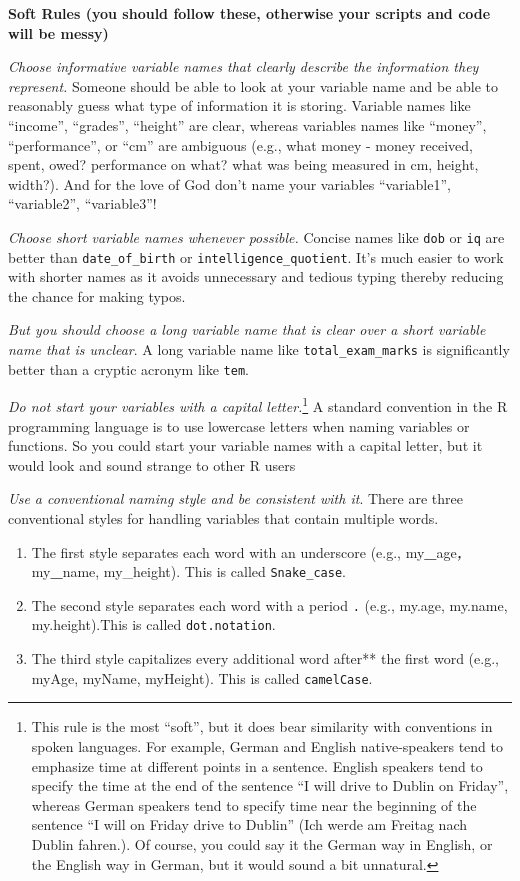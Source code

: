 \documentclass[
]{book}
\begin{document}
\textbf{Soft Rules (you should follow these, otherwise your scripts and code will be messy)}

\emph{Choose informative variable names that clearly describe the information they represent.} Someone should be able to look at your variable name and be able to reasonably guess what type of information it is storing. Variable names like ``income'', ``grades'', ``height'' are clear, whereas variables names like ``money'', ``performance'', or ``cm'' are ambiguous (e.g., what money - money received, spent, owed? performance on what? what was being measured in cm, height, width?). And for the love of God don't name your variables ``variable1'', ``variable2'', ``variable3''!

\emph{Choose short variable names whenever possible.} Concise names like \texttt{dob} or \texttt{iq} are better than \texttt{date\_of\_birth} or \texttt{intelligence\_quotient}. It's much easier to work with shorter names as it avoids unnecessary and tedious typing thereby reducing the chance for making typos.

\emph{But you should choose a long variable name that is clear over a short variable name that is unclear}. A long variable name like \texttt{total\_exam\_marks} is significantly better than a cryptic acronym like \texttt{tem}.

\emph{Do not start your variables with a capital letter.}\footnote{This rule is the most ``soft'', but it does bear similarity with conventions in spoken languages. For example, German and English native-speakers tend to emphasize time at different points in a sentence. English speakers tend to specify the time at the end of the sentence ``I will drive to Dublin on Friday'', whereas German speakers tend to specify time near the beginning of the sentence ``I will on Friday drive to Dublin'' (Ich werde am Freitag nach Dublin fahren.). Of course, you could say it the German way in English, or the English way in German, but it would sound a bit unnatural.} A standard convention in the R programming language is to use lowercase letters when naming variables or functions. So you could start your variable names with a capital letter, but it would look and sound strange to other R users

\emph{Use a conventional naming style and be consistent with it}. There are three conventional styles for handling variables that contain multiple words.

\begin{enumerate}
\def\labelenumi{\arabic{enumi}.}
\item
  The first style separates each word with an underscore (e.g., my\textbf{\_}age\textbf{\emph{,}} my\textbf{\_}name, my\_height). This is called \texttt{Snake\_case}.
\item
  The second style separates each word with a period \texttt{.} (e.g., my.age, my.name, my.height).This is called \texttt{dot.notation}.
\item
  The third style capitalizes every additional word after** the first word (e.g., myAge, myName, myHeight). This is called \texttt{camelCase}.
\end{enumerate}
\end{document}
